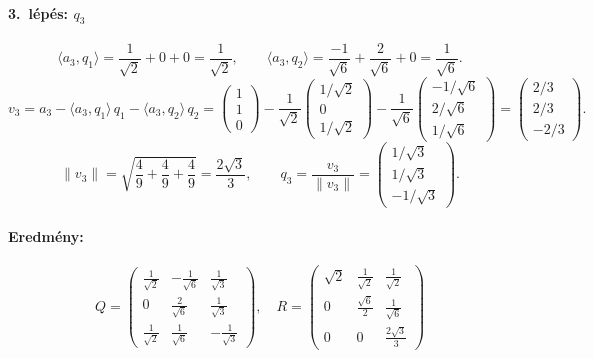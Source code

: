 \documentclass[a4paper,12pt]{article}
\begin{document}
\paragraph{3.\ lépés: $q_3$}
\[
\langle a_3, q_1 \rangle = \frac{1}{\sqrt{2}} + 0 + 0 = \frac{1}{\sqrt{2}}, \qquad
\langle a_3, q_2 \rangle = \frac{-1}{\sqrt{6}} + \frac{2}{\sqrt{6}} + 0 = \frac{1}{\sqrt{6}}.
\]
\[
v_3 = a_3 - \langle a_3, q_1\rangle\,q_1 - \langle a_3, q_2\rangle\,q_2
= \begin{pmatrix}1\\1\\0\end{pmatrix} - \frac{1}{\sqrt{2}}\begin{pmatrix}1/\sqrt{2}\\0\\1/\sqrt{2}\end{pmatrix} - \frac{1}{\sqrt{6}}\begin{pmatrix}-1/\sqrt{6}\\2/\sqrt{6}\\1/\sqrt{6}\end{pmatrix}
= \begin{pmatrix}2/3\\2/3\\-2/3\end{pmatrix}.
\]
\[
\lVert v_3 \rVert = \sqrt{\frac{4}{9}+\frac{4}{9}+\frac{4}{9}} = \frac{2\sqrt{3}}{3}, \qquad
q_3 = \frac{v_3}{\lVert v_3 \rVert} = \begin{pmatrix} 1/\sqrt{3} \\ 1/\sqrt{3} \\ -1/\sqrt{3} \end{pmatrix}.
\]

\paragraph{Eredmény:}
\[
\boxed{
Q = \begin{pmatrix}
\frac{1}{\sqrt{2}} & -\frac{1}{\sqrt{6}} & \frac{1}{\sqrt{3}} \\[4pt]
0 & \frac{2}{\sqrt{6}} & \frac{1}{\sqrt{3}} \\[4pt]
\frac{1}{\sqrt{2}} & \frac{1}{\sqrt{6}} & -\frac{1}{\sqrt{3}}
\end{pmatrix}, \quad
R = \begin{pmatrix}
\sqrt{2} & \frac{1}{\sqrt{2}} & \frac{1}{\sqrt{2}} \\[4pt]
0 & \frac{\sqrt{6}}{2} & \frac{1}{\sqrt{6}} \\[4pt]
0 & 0 & \frac{2\sqrt{3}}{3}
\end{pmatrix}
}
\]
\end{document}

